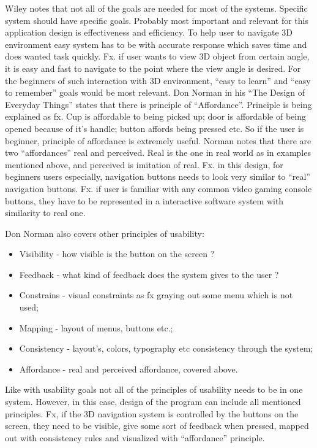 Wiley notes that not all of the goals are needed for most of the systems. Specific system should have specific goals. Probably most important and relevant for this application design is effectiveness and efficiency. To help user to navigate 3D environment easy system has to be with accurate response which saves time and does wanted task quickly. Fx. if user wants to view 3D object from certain angle, it is easy and fast to navigate to the point where the view angle is desired. For the beginners of such interaction with 3D environment, “easy to learn” and “easy to remember” goals would be most relevant. Don Norman in his “The Design of Everyday Things” states that there is principle of “Affordance”. \cite {Norman} Principle is being explained as fx. Cup is affordable to being picked up; door is affordable of being opened because of it’s handle; button affords being pressed etc. So if the user is beginner, principle of affordance is extremely useful. Norman notes that there are two “affordances” real and perceived. Real is the one in real world as in examples mentioned above, and perceived is imitation of real. Fx. in this design, for beginners users especially, navigation buttons needs to look very similar to “real” navigation buttons. Fx. if user is familiar with any common video gaming console buttons, they have to be represented in a interactive software system with similarity to real one. 

Don Norman also covers other principles of usability:
\begin{itemize}
\item Visibility - how visible is the button on the screen ?
\item Feedback - what kind of feedback does the system gives to the user ?
\item Constrains - visual constraints as fx graying out some menu which is not used;
\item Mapping - layout of menus, buttons etc.;
\item Consistency - layout’s, colors, typography etc consistency through the system;
\item Affordance  - real and perceived affordance, covered above.
\end{itemize}
\cite {Norman}

Like with usability goals not all of the principles of usability needs to be in one system. However, in this case, design of the program can include all mentioned principles. Fx, if the 3D navigation system is controlled by the buttons on the screen, they need to be visible, give some sort of feedback when pressed, mapped out with consistency rules and visualized with “affordance” principle. 

